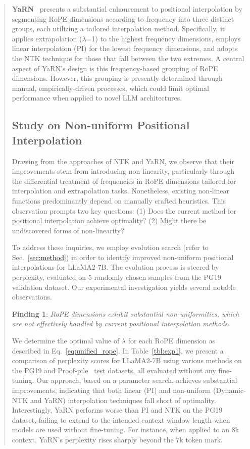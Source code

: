 \begin{abstract}
\textbf{YaRN}~\cite{yarn} presents a substantial enhancement to positional interpolation by segmenting RoPE dimensions according to frequency into three distinct groups, each utilizing a tailored interpolation method. Specifically, it applies extrapolation ($\lambda$=1) to the highest frequency dimensions, employs linear interpolation (PI) for the lowest frequency dimensions, and adopts the NTK technique for those that fall between the two extremes. A central aspect of YaRN's design is this frequency-based grouping of RoPE dimensions. However, this grouping is presently determined through manual, empirically-driven processes, which could limit optimal performance when applied to novel LLM architectures.

\subsection{Study on Non-uniform Positional Interpolation}

Drawing from the approaches of NTK and YaRN, we observe that their improvements stem from introducing non-linearity, particularly through the differential treatment of frequencies in RoPE dimensions tailored for interpolation and extrapolation tasks. Nonetheless, existing non-linear functions predominantly depend on manually crafted heuristics. This observation prompts two key questions: (1) Does the current method for positional interpolation achieve optimality? (2) Might there be undiscovered forms of non-linearity?

To address these inquiries, we employ evolution search (refer to Sec.~\ref{sec:method}) in order to identify improved non-uniform positional interpolations for LLaMA2-7B. The evolution process is steered by perplexity, evaluated on 5 randomly chosen samples from the PG19~\cite{pg19} validation dataset. Our experimental investigation yields several notable observations.

\textbf{Finding 1}: \textit{RoPE dimensions exhibit substantial non-uniformities, which are not effectively handled by current positional interpolation methods.}

We determine the optimal value of $\lambda$ for each RoPE dimension as described in Eq.~\ref{eq:unified_rope}. In Table~\ref{tbl:exp1}, we present a comparison of perplexity scores for LLaMA2-7B using various methods on the PG19 and Proof-pile~\cite{proof-pile} test datasets, all evaluated without any fine-tuning. Our approach, based on a parameter search, achieves substantial improvements, indicating that both linear (PI) and non-uniform (Dynamic-NTK and YaRN) interpolation techniques fall short of optimality. Interestingly, YaRN performs worse than PI and NTK on the PG19 dataset, failing to extend to the intended context window length when models are used without fine-tuning. For instance, when applied to an 8k context, YaRN’s perplexity rises sharply beyond the 7k token mark.


\end{abstract}
